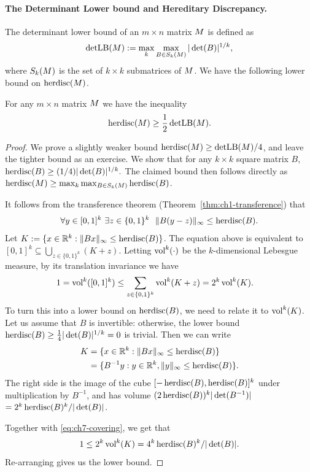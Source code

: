 \paragraph{The Determinant Lower bound and Hereditary Discrepancy.}
The determinant lower bound
  of an $m\times n$ matrix $M$ is defined as
  \begin{equation}
    \label{eq:ch7-detlb-defn}
    \operatorname{detLB}(M) := \max_k \max_{B \in S_k(M)} |\det(B)|^{1/k},
  \end{equation}
  where $S_k(M)$ is the set of $k\times k$ submatrices of
  $M$.
We have the following lower bound on $\operatorname{herdisc}(M)$.
\begin{lemma}\label{lm:ch7-detlb}
  For any $m\times n$ matrix $M$ we have the inequality
  \[
    \operatorname{herdisc}(M) \ge \frac12 \operatorname{detLB}(M).
  \]
\end{lemma}
\begin{proof}
We prove a slightly weaker bound
$\operatorname{herdisc}(M) \ge  \operatorname{detLB}(M)/4$,
  and leave the tighter bound as an exercise.
  We show that for any $k\times k$ square matrix $B$,
  \(
  \operatorname{herdisc}(B) \ge (1/4) |\det(B)|^{1/k}.
  \)
  The claimed bound then follows directly as $\operatorname{herdisc}(M) \ge
  \max_k \max_{B \in S_k(M)} \operatorname{herdisc}(B)$.   
  
\smallskip
  It follows from the transference theorem (Theorem~\ref{thm:ch1-transference}) that 
  \[
    \forall y \in [0,1]^k \ \exists z \in \{0,1\}^k\ \ 
  \|B (y-z)\|_\infty \le \herdisc(B).
  \]
  Let $K := \{x \in \mathbb{R}^k: \|Bx\|_{\infty} \le
  \operatorname{herdisc}(B)\}$. The equation above is equivalent to
  \(
    [0,1]^k \subseteq \bigcup_{z \in \{0,1\}^k} (K + z).
  \)
  Letting $\operatorname{vol}^k(\cdot)$ be the $k$-dimensional Lebesgue
  measure, by its translation invariance we have
  \begin{align}
    1 &= \operatorname{vol}^k([0,1]^k) \le
    \sum_{z \in \{0,1\}^k} \operatorname{vol}^k(K + z) = 2^k \operatorname{vol}^k(K).\label{eq:ch7-covering}
  \end{align}
  To turn this into a lower bound on $\operatorname{herdisc}(B)$, we need to
  relate it to $\operatorname{vol}^k(K)$. Let us assume that $B$ is invertible: 
  otherwise, the lower bound
  \(
  \operatorname{herdisc}(B) \ge \frac14 |\det(B)|^{1/k}=0
  \)
  is trivial. Then we can write
  \begin{align*}
    K & = \{x \in \mathbb{R}^k: \|B x\|_{\infty} \le   \operatorname{herdisc}(B)\}\\
    & = \{B^{-1} y: y\in \mathbb{R}^k, \|y\|_{\infty} \le \operatorname{herdisc}(B)\}.
  \end{align*}
  The right side is the image of the cube
  $[-\operatorname{herdisc}(B),\operatorname{herdisc}(B)]^k$ under multiplication by $B^{-1}$, and
  has volume $
  (2\operatorname{herdisc}(B))^{k} |\det(B^{-1})|$ $=
  2^k\operatorname{herdisc}(B)^k/|\det(B)|$.
  
Together with \eqref{eq:ch7-covering}, 
 we get that \[
    1 \le 2^k\operatorname{vol}^k(K) = 4^k\operatorname{herdisc}(B)^k/|\det(B)|. \]
  Re-arranging gives us the lower bound. 
\end{proof}

